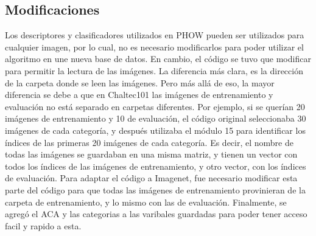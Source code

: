 \documentclass[10pt,twocolumn,letterpaper]{article}
\begin{document}
\subsection{Modificaciones}
Los descriptores y clasificadores utilizados en PHOW pueden ser utilizados para cualquier imagen, por lo cual, no es necesario modificarlos para poder utilizar el algoritmo en une nueva base de datos. En cambio, el código se tuvo que modificar para permitir la lectura de las imágenes. La diferencia más clara, es la dirección de la carpeta donde se leen las imágenes. Pero más allá de eso, la mayor diferencia se debe a que en Chaltec101 las imágenes de entrenamiento y evaluación no está separado en carpetas diferentes. Por ejemplo, si se querían 20 imágenes de entrenamiento y 10 de evaluación, el código original seleccionaba 30 imágenes de cada categoría, y después utilizaba el módulo 15 para identificar los índices de las primeras 20 imágenes de cada categoría. Es decir, el nombre de todas las imágenes se guardaban en una misma matriz, y tienen un vector con todos los índices de las imágenes de entrenamiento, y otro vector, con los índices de evaluación. Para adaptar el código a Imagenet, fue necesario modificar esta parte del código para que todas las imágenes de entrenamiento provinieran de la carpeta de entrenamiento, y lo mismo con las de evaluación. Finalmente, se agregó el ACA y las categorias a las varibales guardadas para poder tener acceso facil y rapido a esta. 
\end{document}
